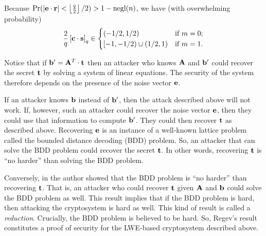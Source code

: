 \documentclass[../main.tex]{subfiles}
\begin{document}
\noindent{}Because $\text{Pr}(|\mathbf{e} \cdot \mathbf{r}| < \left\lfloor{\frac{q}{2}}\right\rfloor/2) > 1 - \text{negl}(n)$, we have (with overwhelming probability)
\begin{equation*}
\frac{2}{q}\left[{\mathbf{c} \cdot \mathbf{s}}\right]_q \in
\begin{cases}
(-1/2,1/2) & \text{if $m=0$;} \\
[-1, -1/2) \cup (1/2,1) & \text{if $m = 1$}.
\end{cases}
\end{equation*}

Notice that if $\mathbf{b}^{\prime} = \mathbf{A}^T \cdot \mathbf{t}$ then an attacker who knows $\mathbf{A}$ and $\mathbf{b}^{\prime}$ could recover the secret $\mathbf{t}$ by solving a system of linear equations. The security of the system therefore depends on the presence of the noise vector $\mathbf{e}$.

If an attacker knows $\mathbf{b}$ instead of $\mathbf{b}^{\prime}$, then the attack described above will not work. If, however, such an attacker could recover the noise vector $\mathbf{e}$, then they could use that information to compute $\mathbf{b}^{\prime}$. They could then recover $\mathbf{t}$ as described above. Recovering $\mathbf{e}$ is an instance of a well-known lattice problem called the bounded distance decoding (BDD) problem. So, an attacker that can solve the BDD problem could recover the secret $\mathbf{t}$. In other words, recovering $\mathbf{t}$ is ``no harder'' than solving the BDD problem.

Conversely, in \cite{regev2009lattices} the author showed that the BDD problem is ``no harder'' than recovering $\mathbf{t}$. That is, an attacker who could recover $\mathbf{t}$ given $\mathbf{A}$ and $\mathbf{b}$ could solve the BDD problem as well. This result implies that if the BDD problem is hard, then attacking the cryptosystem is hard as well. This kind of result is called a \emph{reduction}.
Crucially, the BDD problem is believed to be hard. So, Regev's result constitutes a proof of security for the LWE-based cryptosystem described above.
\end{document}
